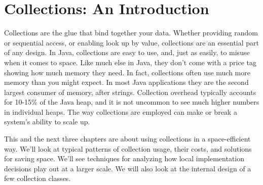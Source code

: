 \chapter{Collections: An Introduction}
\label{chapter:brief-introduction-collections}

Collections are the glue that bind together your data. 
Whether providing random or sequential access, or
enabling look up by value, collections are an essential part of any design.
In Java, collections are easy to use, and, just as easily, to misuse
when it comes to space. Like much else in Java, they don't come with a price tag
showing how much memory they need. In fact, collections
often use much more memory than you might expect. In most Java applications they are the
second largest consumer of memory, after
strings.  Collection overhead typically accounts
for 10-15\% of the Java heap, and it is not uncommon to see much higher numbers
in individual heaps. The way collections are employed can make or break a system's
ability to scale up.

This and the next three chapters are about using
collections in a space-efficient way. We'll look at typical patterns of
collection usage, their costs, and solutions for saving space. We'll see
techniques for analyzing how local implementation decisions play out at a larger scale.
We will also look at the internal design of a few collection classes.




%

